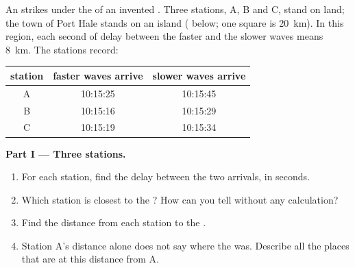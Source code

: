 \begin{problem}
\label{pb:g7:earthquakes:1}
An  strikes under the  of an invented . Three
 stations, A, B and C, stand on land; the town of Port Hale
stands on an island ( below; one square is \qty{20}{km}). In this
region, each second of delay between the faster and the slower waves means
\qty{8}{km}. The stations record:

\begin{center}
\small
\begin{tabular}{|c|c|c|}
\hline
\textbf{station} & \textbf{faster waves arrive} & \textbf{slower waves arrive} \\
\hline
A & 10:15:25 & 10:15:45 \\
B & 10:15:16 & 10:15:29 \\
C & 10:15:19 & 10:15:34 \\
\hline
\end{tabular}
\end{center}

\medskip
\noindent\textbf{Part I --- Three stations.}\par\nopagebreak
\begin{enumerate}[beginpenalty=10000]
  \item For each station, find the delay between the two arrivals, in
        seconds.
  \item Which station is closest to the ? How can you tell
        without any calculation?
  \item Find the distance from each station to the .
  \item Station A's distance alone does not say where the  was.
        Describe all the places that are at this distance from A.
\end{enumerate}


\end{problem}

